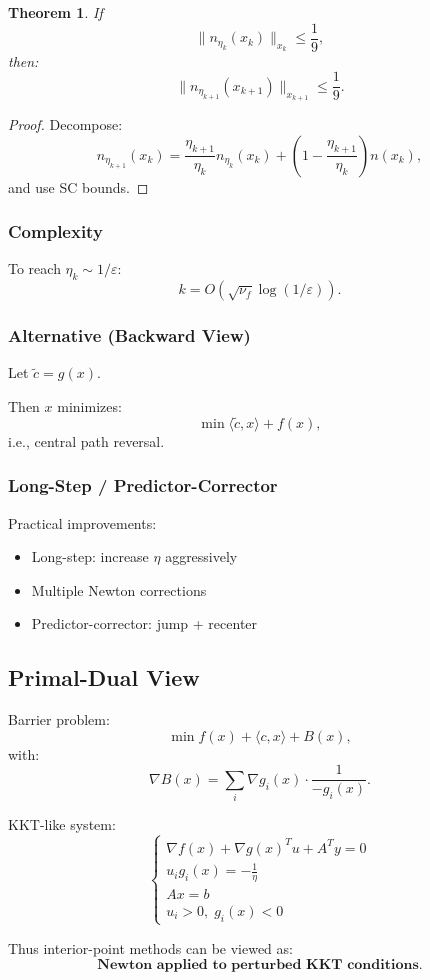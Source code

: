 \documentclass[12pt,oneside]{book}
\numberwithin{equation}{section}
\theoremstyle{definition}
\theoremstyle{plain}
\newtheorem{theorem}{Theorem}[section]
\theoremstyle{remark}
\begin{document}
\begin{theorem}
If
\[
\|n_{\eta_k}(x_k)\|_{x_k} \le \frac{1}{9},
\]
then:
\[
\|n_{\eta_{k+1}}(x_{k+1})\|_{x_{k+1}} \le \frac{1}{9}.
\]
\end{theorem}

\begin{proof}
Decompose:
\[
n_{\eta_{k+1}}(x_k)
=
\frac{\eta_{k+1}}{\eta_k} n_{\eta_k}(x_k)
+
\left(1 - \frac{\eta_{k+1}}{\eta_k}\right)n(x_k),
\]
and use SC bounds.
\end{proof}

\subsubsection*{Complexity}

To reach $\eta_k \sim 1/\varepsilon$:
\[
k = O(\sqrt{\nu_f} \log(1/\varepsilon)).
\]

\subsubsection*{Alternative (Backward View)}

Let $\tilde c = g(x)$.

Then $x$ minimizes:
\[
\min \langle \tilde c, x\rangle + f(x),
\]
i.e., central path reversal.

\subsubsection*{Long-Step / Predictor-Corrector}

Practical improvements:
\begin{itemize}
\item Long-step: increase $\eta$ aggressively
\item Multiple Newton corrections
\item Predictor-corrector: jump + recenter
\end{itemize}

\subsection{Primal-Dual View}

Barrier problem:
\[
\min f(x) + \langle c,x\rangle + B(x),
\]
with:
\[
\nabla B(x) = \sum_i \nabla g_i(x)\cdot \frac{1}{-g_i(x)}.
\]

KKT-like system:
\[
\begin{cases}
\nabla f(x) + \nabla g(x)^T u + A^T y = 0 \\
u_i g_i(x) = -\tfrac{1}{\eta} \\
Ax = b \\
u_i > 0,\; g_i(x) < 0
\end{cases}
\]

\noindent
Thus interior-point methods can be viewed as:
\[
\textbf{Newton applied to perturbed KKT conditions}.
\]
\end{document}
